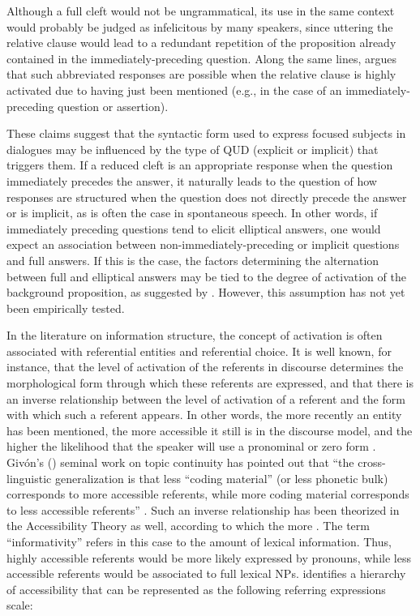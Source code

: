 Although a full cleft would not be ungrammatical, its use in the same context would probably be judged as infelicitous by many speakers, since uttering the relative clause would lead to a redundant repetition of the proposition already contained in the immediately-preceding question. Along the same lines, \textcite{katz2000categories} argues that such abbreviated responses are possible when the relative clause is highly activated due to having just been mentioned (e.g., in the case of an immediately-preceding question or assertion). 

These claims suggest that the syntactic form used to express focused subjects in dialogues may be influenced by the type of QUD (explicit or implicit) that triggers them. If a reduced cleft is an appropriate response when the question immediately precedes the answer, it naturally leads to the question of how responses are structured when the question does not directly precede the answer or is implicit, as is often the case in spontaneous speech. In other words, if immediately preceding questions tend to elicit elliptical answers, one would expect an association between non-immediately-preceding or implicit questions and full answers.
If this is the case, the factors determining the alternation between full and elliptical answers may be tied to the degree of activation of the background proposition, as suggested by \textcite{katz2000categories}. However, this assumption has not yet been empirically tested. 

 In the literature on information structure, the concept of activation is often associated with referential entities and referential choice. It is well known, for instance, that the level of activation of the referents in discourse determines the morphological form through which these referents are expressed, and that there is an inverse relationship between the level of activation of a referent and the form with which  such a referent appears.  In other words, the more recently an entity has been mentioned, the more accessible it still is in the discourse model, and the higher the likelihood that the speaker will use a pronominal or zero form \parencite{givon1983topic}. Givón’s (\citeyear{givon1983topic}) seminal work on topic continuity has pointed out that ``the cross-linguistic generalization is that less “coding material” (or less phonetic bulk) corresponds to more accessible referents, while more coding material corresponds to less accessible referents” \parencite[18]{givon1983topic}. 
Such an inverse relationship has been theorized in the Accessibility Theory \parencite{ariel1988referring} as well, according to which the more  \parencite[32]{ariel2001accessibility}. The term ``informativity” refers in this case to the amount of lexical information. Thus, highly accessible referents would be more likely expressed by pronouns, while less accessible referents would be associated to full lexical NPs. \textcite{ariel2001accessibility} identifies a hierarchy of accessibility that can be represented as the following referring expressions scale:

